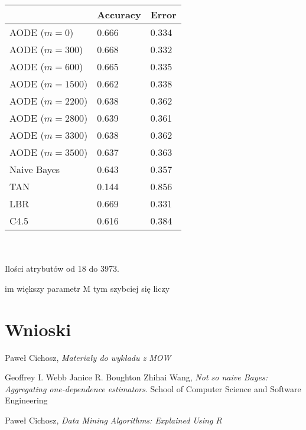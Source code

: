 \documentclass[16]{article}
\begin{document}
\begin{tabular}{ |l|l|l| }
\hline
&  Accuracy & Error
\\ \hline
AODE ($m = 0$) & 0.666 & 0.334
\\ \hline
AODE ($m = 300$) & 0.668 & 0.332
\\ \hline
AODE ($m = 600$) & 0.665 & 0.335
\\ \hline
AODE ($m = 1500$) & 0.662 & 0.338
\\ \hline
AODE ($m = 2200$) & 0.638 & 0.362
\\ \hline
AODE ($m = 2800$) & 0.639 & 0.361
\\ \hline
AODE ($m = 3300$) & 0.638 & 0.362
\\ \hline
AODE ($m = 3500$) &0.637 & 0.363
\\ \hline
Naive Bayes & 0.643 & 0.357
\\ \hline
TAN & 0.144 & 0.856
\\ \hline
LBR & 0.669 & 0.331
\\ \hline
C4.5 & 0.616 & 0.384
\\ \hline
\end{tabular} \\\\

Ilości atrybutów od 18 do 3973. 

im większy parametr M tym szybciej się liczy

\section{Wnioski}


\begin{thebibliography}{9}
	
		Paweł Cichosz,
		\emph{Materiały do wykładu z MOW}
			
		Geoffrey I. Webb
		Janice R. Boughton
		Zhihai Wang,
		\emph{Not so naive Bayes: Aggregating one-dependence estimators}.
		School of Computer Science and Software Engineering
    
		Paweł Cichosz,
		\emph{Data Mining Algorithms: Explained Using R}
\end{thebibliography}
\end{document}
